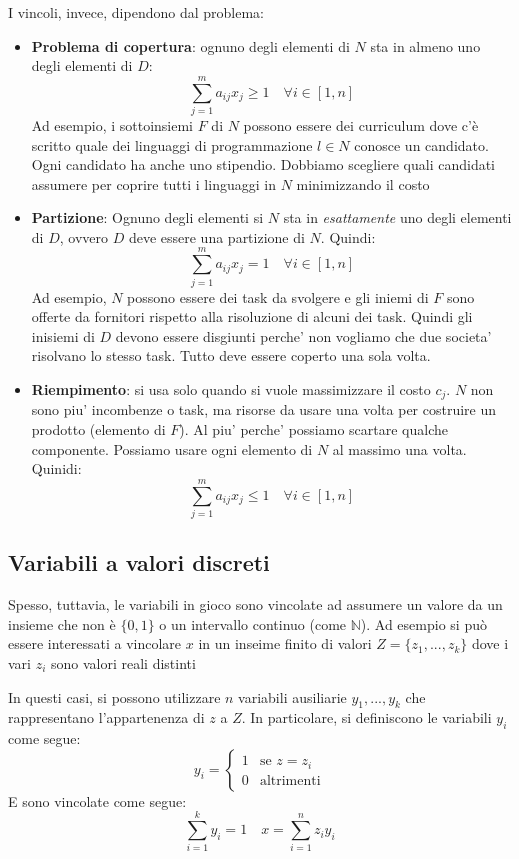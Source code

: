 I vincoli, invece, dipendono dal problema:
\begin{itemize}
\item \textbf{Problema di copertura}: ognuno degli elementi di $N$ sta in almeno uno degli elementi di $ D $:
    \[
      \sum_{j=1}^{m} a_{ij}x_j \geq 1 \quad \forall i \in [1,n]
    \]
   Ad esempio, i sottoinsiemi $ F $ di $ N $ possono essere dei curriculum dove c'è scritto quale dei linguaggi di programmazione $ l \in N $ conosce un candidato. Ogni candidato ha anche uno stipendio. Dobbiamo scegliere quali candidati assumere per coprire tutti i linguaggi in $ N $ minimizzando il costo
  \item \textbf{Partizione}: Ognuno degli elementi si $N$ sta in \textit{esattamente} uno degli elementi di $D$, ovvero $D$ deve essere una partizione di $ N $. Quindi:
    \[
    \sum_{j=1}^{m} a_{ij}x_j = 1 \quad \forall i \in [1,n]
    \]
    Ad esempio, $ N $ possono essere dei task da svolgere e gli iniemi di $ F $ sono offerte da fornitori rispetto alla risoluzione di alcuni dei task. Quindi gli inisiemi di $ D $ devono essere disgiunti perche' non vogliamo che due societa' risolvano lo stesso task. Tutto deve essere coperto una sola volta.

  \item \textbf{Riempimento}: si usa solo quando si vuole massimizzare il costo $c_j$. $ N $ non sono piu' incombenze o task, ma risorse da usare una volta per costruire un prodotto (elemento di $ F $). Al piu' perche' possiamo scartare qualche componente. Possiamo usare ogni elemento di $ N $ al massimo una volta. Quinidi:
  \[
    \sum^m_{j=1} a_{ij}x_j \leq 1 \quad \forall i\in [1,n]
  \]
\end{itemize}
\subsection{Variabili a valori discreti}
Spesso, tuttavia, le variabili in gioco sono vincolate ad assumere un valore da un insieme che non è $\{0,1\}$ o un intervallo continuo (come $\mathbb{N}$). Ad esempio si può essere interessati a vincolare $x$ in un inseime finito di valori $Z = \{z_1,...,z_k\}$ dove i vari $z_i$ sono valori reali distinti 

In questi casi, si possono utilizzare $n$ variabili ausiliarie $y_1,...,y_k$ che rappresentano l'appartenenza di $z$ a $Z$. In particolare, si definiscono le variabili $y_i$ come segue:
\[
  y_i = \begin{cases}
    1 & \text{se } z = z_i\\
    0 & \text{altrimenti}
  \end{cases}
\]
E sono vincolate come segue:
\[
  \sum_{i=1}^{k} y_i = 1 \quad x=\sum^n_{i=1}z_i y_i
\]


